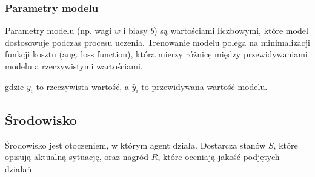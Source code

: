 \subsubsection{Parametry modelu}

Parametry modelu (np. wagi \(w\) i biasy \(b\)) są wartościami liczbowymi, które model dostosowuje podczas procesu uczenia. Trenowanie modelu polega na minimalizacji funkcji kosztu (ang. loss function), która mierzy różnicę między przewidywaniami modelu a rzeczywistymi wartościami.


gdzie \(y_i\) to rzeczywista wartość, a \(\hat{y}_i\) to przewidywana wartość modelu.

\subsection{Środowisko}
Środowisko jest otoczeniem, w którym agent działa. Dostarcza stanów \( S \), które opisują aktualną sytuację, oraz nagród \( R \), które oceniają jakość podjętych działań.

